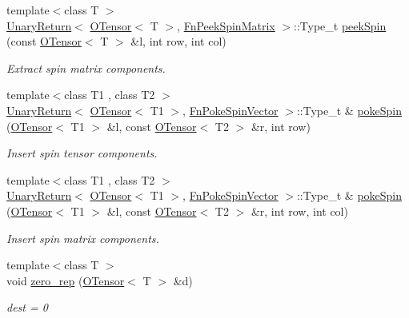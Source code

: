 \begin{DoxyCompactItemize}
{\footnotesize template$<$class T $>$ }\\\mbox{\hyperlink{structENSEM_1_1UnaryReturn}{Unary\+Return}}$<$ \mbox{\hyperlink{classENSEM_1_1OTensor}{O\+Tensor}}$<$ T $>$, \mbox{\hyperlink{structENSEM_1_1FnPeekSpinMatrix}{Fn\+Peek\+Spin\+Matrix}} $>$\+::Type\+\_\+t \mbox{\hyperlink{group__obstensor_ga7cb1fd7617714b490522aee26dd999be}{peek\+Spin}} (const \mbox{\hyperlink{classENSEM_1_1OTensor}{O\+Tensor}}$<$ T $>$ \&l, int row, int col)
\begin{DoxyCompactList}\small\item\em Extract spin matrix components. \end{DoxyCompactList}\item 
{\footnotesize template$<$class T1 , class T2 $>$ }\\\mbox{\hyperlink{structENSEM_1_1UnaryReturn}{Unary\+Return}}$<$ \mbox{\hyperlink{classENSEM_1_1OTensor}{O\+Tensor}}$<$ T1 $>$, \mbox{\hyperlink{structENSEM_1_1FnPokeSpinVector}{Fn\+Poke\+Spin\+Vector}} $>$\+::Type\+\_\+t \& \mbox{\hyperlink{group__obstensor_ga8cc48d37eeb15654e69ed5549844c124}{poke\+Spin}} (\mbox{\hyperlink{classENSEM_1_1OTensor}{O\+Tensor}}$<$ T1 $>$ \&l, const \mbox{\hyperlink{classENSEM_1_1OTensor}{O\+Tensor}}$<$ T2 $>$ \&r, int row)
\begin{DoxyCompactList}\small\item\em Insert spin tensor components. \end{DoxyCompactList}\item 
{\footnotesize template$<$class T1 , class T2 $>$ }\\\mbox{\hyperlink{structENSEM_1_1UnaryReturn}{Unary\+Return}}$<$ \mbox{\hyperlink{classENSEM_1_1OTensor}{O\+Tensor}}$<$ T1 $>$, \mbox{\hyperlink{structENSEM_1_1FnPokeSpinVector}{Fn\+Poke\+Spin\+Vector}} $>$\+::Type\+\_\+t \& \mbox{\hyperlink{group__obstensor_ga2d8623a3d55d368dba3e7b2e1418b6a1}{poke\+Spin}} (\mbox{\hyperlink{classENSEM_1_1OTensor}{O\+Tensor}}$<$ T1 $>$ \&l, const \mbox{\hyperlink{classENSEM_1_1OTensor}{O\+Tensor}}$<$ T2 $>$ \&r, int row, int col)
\begin{DoxyCompactList}\small\item\em Insert spin matrix components. \end{DoxyCompactList}\item 
{\footnotesize template$<$class T $>$ }\\void \mbox{\hyperlink{group__obstensor_gaf56968b79ae090632d1e778d827ac0dd}{zero\+\_\+rep}} (\mbox{\hyperlink{classENSEM_1_1OTensor}{O\+Tensor}}$<$ T $>$ \&d)
\begin{DoxyCompactList}\small\item\em dest = 0 \end{DoxyCompactList}\item 

\end{DoxyCompactItemize}
